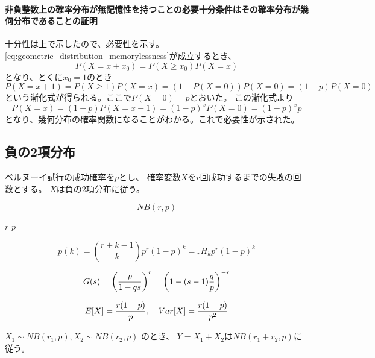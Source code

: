 \paragraph{非負整数上の確率分布が無記憶性を持つことの必要十分条件はその確率分布が幾何分布であることの証明}
十分性は上で示したので、必要性を示す。
\cref{eq:geometric_distribution_memorylessness}が成立するとき、
\begin{equation}
  P(X = x + x_0) = P(X \geq x_0) P(X = x)
\end{equation}
となり、とくに\(x_0 = 1\)のとき
\begin{equation}
  P(X = x + 1) = P(X \geq 1) P(X = x) = (1 - P(X = 0)) P(X = 0) = (1 - p) P(X = 0)
\end{equation}
という漸化式が得られる。ここで\(P(X=0) = p\)とおいた。
この漸化式より
\begin{equation}
  P(X = x) = (1 - p) P(X = x - 1) = (1 - p)^{x} P(X = 0) = (1 - p)^{x}p
\end{equation}
となり、幾何分布の確率関数になることがわかる。これで必要性が示された。

\subsection{負の2項分布}

\begin{outline}[description]
  \1 [意味] ベルヌーイ試行の成功確率を\(p\)とし、
  確率変数\(X\)を\(r\)回成功するまでの失敗の回数とする。
  \(X\)は負の2項分布に従う。
  
  \1 [表記]
  \begin{equation}
    NB(r, p)
  \end{equation}
  
  \1 [パラメータ]
  \2
  \2 [成功回数] \(r\)
  \2 [成功確率] \(p\)
  
  \1 [確率関数]
  \begin{equation}
    p (k) = \binom{r + k - 1}{k} p^r (1-p)^{k} = {}_{r} H_{k} p^r (1-p)^{k}
  \end{equation}
  
  \1 [確率母関数]
  \begin{equation}
    G (s) = \qty (\frac{p}{1 - qs})^{r} = \qty ( 1 - (s - 1) \frac{q}{p})^{-r}
  \end{equation}
  
  \1 [期待値・分散]
  \begin{equation}
    E \qty [ X] = \frac{r(1 - p)}{p}, \quad Var \qty [ X ] = \frac{r(1 - p)}{p^2}
  \end{equation}
  
  \1 [再生性]
  \(X_1 \sim NB(r_1, p), X_2 \sim NB(r_2, p)\) のとき、
  \(Y = X_1 + X_2\)は\(NB(r_1 + r_2, p)\)に従う。
\end{outline}

